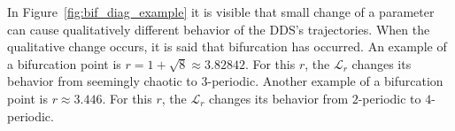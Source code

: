 \begin{remark}
    In Figure~\ref{fig:bif_diag_example} it is visible that small change of a parameter can cause qualitatively different behavior of the DDS's trajectories.
    When the qualitative change occurs, it is said that bifurcation has occurred.
    An example of a bifurcation point is $r = 1+\sqrt{8} \approx 3.82842$. For this $r$, the $\mathcal{L}_{r}$ changes its behavior from seemingly chaotic to $3$-periodic. 
    Another example of a bifurcation point is $r \approx 3.446$. For this $r$, the $\mathcal{L}_{r}$ changes its behavior from $2$-periodic to $4$-periodic.
\end{remark}